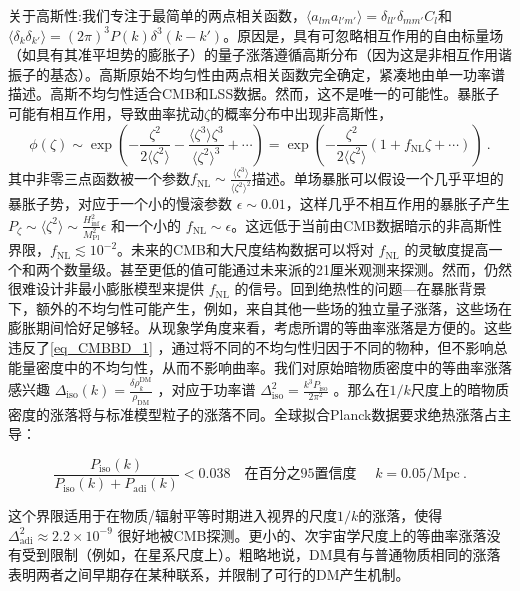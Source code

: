 关于高斯性:我们专注于最简单的两点相关函数，$\langle a_{lm}a_{l'm'}\rangle = \delta_{ll'}\delta_{mm'} C_l$和
$\langle \delta_k \delta_{k'}\rangle = (2\pi)^3 P(k)  \delta^3(k - k')$。原因是，具有可忽略相互作用的自由标量场（如具有其准平坦势的膨胀子）的量子涨落遵循高斯分布（因为这是非相互作用谐振子的基态）。高斯原始不均匀性由两点相关函数完全确定，紧凑地由单一功率谱描述。高斯不均匀性适合CMB和LSS数据。然而，这不是唯一的可能性。暴胀子可能有相互作用，导致曲率扰动$\zeta$的概率分布中出现非高斯性，
\begin{equation}
\phi(\zeta) \sim \exp \left( -\frac{\zeta^2}{2\langle\zeta^2\rangle} - \frac{\langle\zeta^3\rangle\zeta^3}{\langle\zeta^2\rangle^3} + \cdots \right) = \exp \left( -\frac{\zeta^2}{2\langle\zeta^2\rangle} (1 + f_{\text{NL}}\zeta + \cdots) \right) ~.
\end{equation}
其中非零三点函数被一个参数\( f_{\text{NL}} \sim \frac{\langle\zeta^3\rangle}{\langle\zeta^2\rangle^2} \)描述。单场暴胀可以假设一个几乎平坦的暴胀子势，对应于一个小的慢滚参数 \( \epsilon \sim 0.01 \)，这样几乎不相互作用的暴胀子产生 \( P_\zeta \sim \langle\zeta^2\rangle \sim \frac{H^2_{\text{inf}}}{M^2_{\text{Pl}}}\epsilon \) 和一个小的 \( f_{\text{NL}} \sim \epsilon \)。这远低于当前由CMB数据暗示的非高斯性界限，\( f_{\text{NL}} \lesssim 10^{-2} \)。未来的CMB和大尺度结构数据可以将对 \( f_{\text{NL}} \) 的灵敏度提高一个和两个数量级。甚至更低的值可能通过未来派的21厘米观测来探测。然而，仍然很难设计非最小膨胀模型来提供 \( f_{\text{NL}} \) 的信号。回到绝热性的问题—在暴胀背景下，额外的不均匀性可能产生，例如，来自其他一些场的独立量子涨落，这些场在膨胀期间恰好足够轻。从现象学角度来看，考虑所谓的等曲率涨落是方便的。这些违反了\autoref{eq_CMBBD_1} ，通过将不同的不均匀性归因于不同的物种，但不影响总能量密度中的不均匀性，从而不影响曲率。我们对原始暗物质密度中的等曲率涨落感兴趣 \( \Delta_{\text{iso}}(k) = \frac{\delta\rho_k^{\text{DM}}}{\rho_{\text{DM}}} \) ，对应于功率谱 \( \Delta^2_{\text{iso}} = \frac{k^3P_{\text{iso}}}{2\pi^2} \) 。那么在$1/k$尺度上的暗物质密度的涨落将与标准模型粒子的涨落不同。全球拟合Planck数据要求绝热涨落占主导：

\[ \frac{P_{\text{iso}}(k)}{P_{\text{iso}}(k) + P_{\text{adi}}(k)} < 0.038 \quad \text{在百分之95置信度 }\quad k = 0.05/\text{Mpc} ~. \]

这个界限适用于在物质/辐射平等时期进入视界的尺度$1/k$的涨落，使得 \( \Delta^2_{\text{adi}} \approx 2.2 \times 10^{-9} \) 很好地被CMB探测。更小的、次宇宙学尺度上的等曲率涨落没有受到限制（例如，在星系尺度上）。粗略地说，DM具有与普通物质相同的涨落表明两者之间早期存在某种联系，并限制了可行的DM产生机制。

